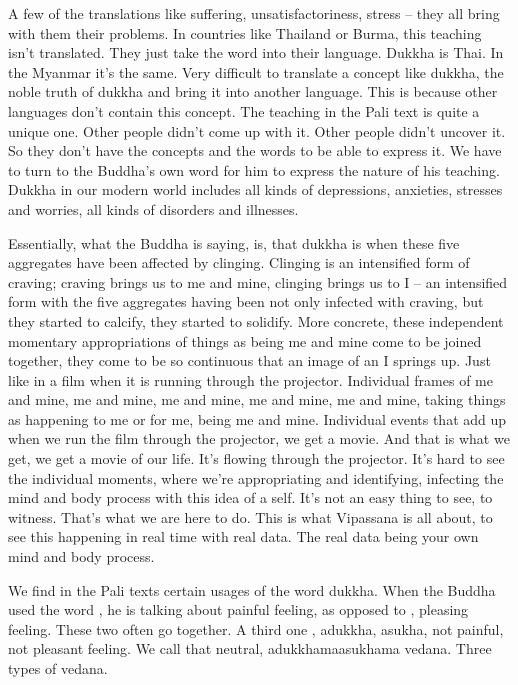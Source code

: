 \documentclass[letterpaper,10pt,english]{sphinxmanual}
\begin{document}
\sphinxAtStartPar
A few of the translations like suffering, unsatisfactoriness, stress – they
all  bring  with  them  their  problems.  In  countries  like  Thailand  or  Burma,
this  teaching  isn’t  translated. They  just  take  the  word  into  their  language.
Dukkha  is  Thai.  In  the  Myanmar  it’s  the  same.  Very  difficult  to  translate
a concept like dukkha, the noble truth of dukkha and bring it into another
language. This  is  because  other  languages  don’t  contain  this  concept. The
teaching in the Pali text is quite a unique one. Other people didn’t come up
with it. Other people didn’t uncover it. So they don’t have the concepts and
the words to be able to express it. We have to turn to the Buddha’s own word
for him to express the nature of his teaching. Dukkha in our modern world
includes all kinds of depressions, anxieties, stresses and worries, all kinds of
disorders and illnesses.

\sphinxAtStartPar
Essentially, what the Buddha is saying, is, that dukkha is when these
five  aggregates  have  been  affected  by  clinging.  Clinging  is  an  intensified
form of craving; craving brings us to me and mine, clinging brings us to I
– an intensified form with the five aggregates having been not only infected
with craving, but they started to calcify, they started to solidify. More concrete,  these  independent  momentary  appropriations  of  things  as  being  me
and mine come to be joined together, they come to be so continuous that an
image of an I springs up. Just like in a film when it is running through the
projector. Individual frames of me and mine, me and mine, me and mine, me
and mine, me and mine, taking things as happening to me or for me, being
me and mine. Individual events that add up when we run the film through
the projector, we get a movie. And that is what we get, we get a movie of
our  life.  It’s  flowing  through  the  projector.  It’s  hard  to  see  the  individual
moments, where we’re appropriating and identifying, infecting the mind and
body process with this idea of a self. It’s not an easy thing to see, to witness.
That’s what we are here to do. This is what Vipassana is all about, to see this
  happening in real time with real data. The real data being your own mind
and body process.

\sphinxAtStartPar
We find in the Pali texts certain usages of the word dukkha. When the
Buddha used the word
, he is talking about painful feeling, as
opposed to
, pleasing feeling. These two often go together. A
third one
, a\sphinxhyphen{}dukkha, a\sphinxhyphen{}sukha, not painful, not pleasant feeling. We call that neutral, adukkhama\sphinxhyphen{}asukhama vedana. Three types
of vedana.
\end{document}

